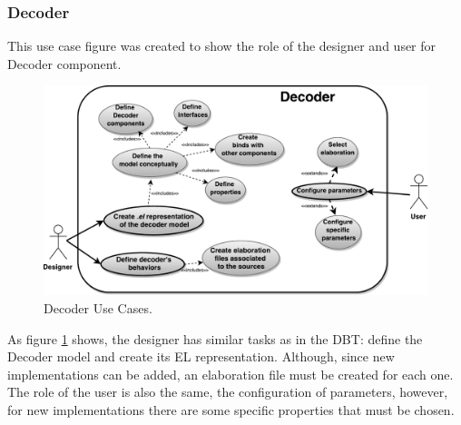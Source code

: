 \subsubsection{Decoder}

This use case figure was created to show the role of the designer and user for Decoder component. 

\begin{figure}[!htb]
\centerline{
\includegraphics[scale=0.65]{images/Decoder_UseCases.pdf} }
\caption{Decoder Use Cases.}
\label{fig:DecoderUseCases} 
\end{figure}

As figure \ref{fig:DecoderUseCases} shows, the designer has similar tasks as in the DBT: define the Decoder model and create its EL representation. Although, since new implementations can be added, an elaboration file must be created for each one. The role of the user is also the same, the configuration of parameters, however, for new implementations there are some specific properties that must be chosen.
